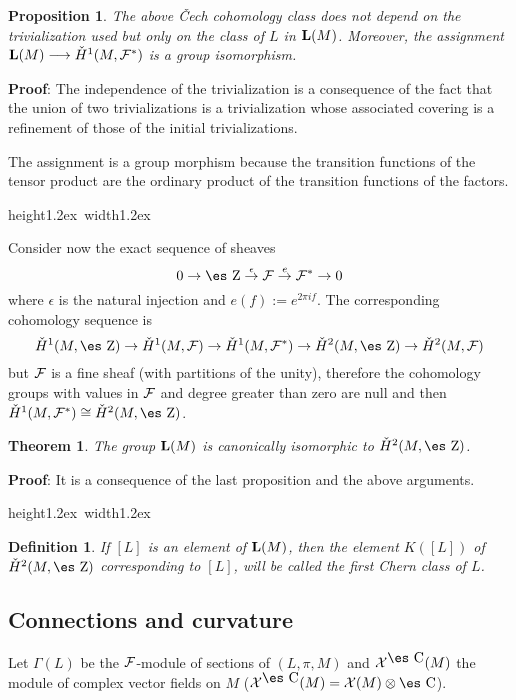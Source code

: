 \documentclass[12pt]{article}
\newtheorem{teor}{Theorem}
\newtheorem{prop}{Proposition}
\newtheorem{definition}{Definition}
\def\map#1{\mathrel{\mathop{\to}\limits^{#1}}}
\def\qed{\ifvmode\removelastskip\fi
{\unskip\nobreak\hfil\penalty50\hbox{}\nobreak\hfil
\hbox{\vrule height1.2ex width1.2ex}\parfillskip=0pt
\finalhyphendemerits=0 \par\smallskip}}
\def\Zahl{\mbox{\es Z}}
\def\Complex{\mbox{\es C}}
\begin{document}
\begin{prop}
The above \v{C}ech cohomology class
does not depend on the trivialization used
but only on the class of $L$ in ${\bf L}(M)$. Moreover, the assignment
${\bf L}(M) \longrightarrow \check{H}^1 (M,{\cal F}^*)$
is a group isomorphism.
\label{indep}
\end{prop}
{\bf Proof}: 
The independence of the trivialization
is a consequence of the fact that
the union of two trivializations is
a trivialization whose associated covering is
a refinement of those of the initial trivializations.

The assignment is a group morphism because
the transition functions of the tensor product
are the ordinary product of the transition functions
of the factors.
\qed

Consider now the exact sequence of sheaves
$$
0 \to \Zahl \map{\epsilon} {\cal F} \map{e} {\cal F}^* \to 0
$$
where $\epsilon$ is the natural injection and
$e(f):=e^{2\pi if}$.
The corresponding cohomology sequence is
$$
\check{H}^1(M,\Zahl ) \to
\check{H}^1(M,{\cal F}) \to
\check{H}^1(M,{\cal F}^*) \to
\check{H}^2(M,\Zahl) \to
\check{H}^2(M,{\cal F})
$$
but ${\cal F}$ is a fine sheaf
(with partitions of the unity),
therefore the cohomology groups with values in
${\cal F}$ and degree greater than zero are null and then
$\check{H}^1(M,{\cal F}^*) \cong  \check{H}^2(M,\Zahl)$.

\begin{teor}
The group ${\bf L}(M)$ is canonically isomorphic to $
\check{H}^2(M,\Zahl )$.
\label{cais}
\end{teor}
{\bf Proof}: 
It is a consequence of the last proposition and the above arguments.
\qed

\begin{definition}
If $[L]$ is an element of  ${\bf L}(M)$,
then the element $K([L])$ of $\check{H}^2(M,\Zahl)$
corresponding to $[L]$, will be called the
{\rm first Chern class} of $L$.
\label{chern}
\end{definition}


\subsection{Connections and curvature}


Let $\Gamma (L)$ be the ${\cal F}$-module of sections
of $(L,\pi ,M)$ and ${\cal X}^{\Complex}(M)$
the module of complex vector fields on $M$
(${\cal X}^{\Complex}(M) = {\cal X}(M) \otimes \Complex$).
\end{document}
